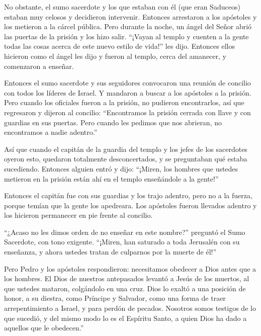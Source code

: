  No obstante, el sumo sacerdote y los que estaban con él
(que eran Saduceos) estaban muy celosos y decidieron intervenir.
 Entonces arrestaron a los apóstoles y los metieron a la
cárcel pública.  Pero durante la noche, un ángel del Señor
abrió las puertas de la prisión y los hizo salir.  ``¡Vayan
al templo y cuenten a la gente todas las cosas acerca de este nuevo
estilo de vida!'' les dijo.  Entonces ellos hicieron como
el ángel les dijo y fueron al templo, cerca del amanecer, y comenzaron a
enseñar.

Entonces el sumo sacerdote y sus seguidores convocaron una reunión de
concilio con todos los líderes de Israel. Y mandaron a buscar a los
apóstoles a la prisión.  Pero cuando los oficiales fueron a
la prisión, no pudieron encontrarlos, así que regresaron y dijeron al
concilio:  ``Encontramos la prisión cerrada con llave y con
guardias en sus puertas. Pero cuando les pedimos que nos abrieran, no
encontramos a nadie adentro.''

 Así que cuando el capitán de la guardia del templo y los
jefes de los sacerdotes oyeron esto, quedaron totalmente desconcertados,
y se preguntaban qué estaba sucediendo.  Entonces alguien
entró y dijo: ``¡Miren, los hombres que ustedes metieron en la prisión
están ahí en el templo enseñándole a la gente!''

 Entonces el capitán fue con sus guardias y los trajo
adentro, pero no a la fuerza, porque temían que la gente los apedreara.
 Los apóstoles fueron llevados adentro y los hicieron
permanecer en pie frente al concilio.

 ``¿Acaso no les dimos orden de no enseñar en este
nombre?'' preguntó el Sumo Sacerdote, con tono exigente. ``¡Miren, han
saturado a toda Jerusalén con su enseñanza, y ahora ustedes tratan de
culparnos por la muerte de él!''

 Pero Pedro y los apóstoles respondieron: necesitamos
obedecer a Dios antes que a los hombres.  El Dios de
nuestros antepasados levantó a Jesús de los muertos, al que ustedes
mataron, colgándolo en una cruz.  Dios lo exaltó a una
posición de honor, a su diestra, como Príncipe y Salvador, como una
forma de traer arrepentimiento a Israel, y para perdón de pecados.
 Nosotros somos testigos de lo que sucedió, y del mismo
modo lo es el Espíritu Santo, a quien Dios ha dado a aquellos que le
obedecen.''

